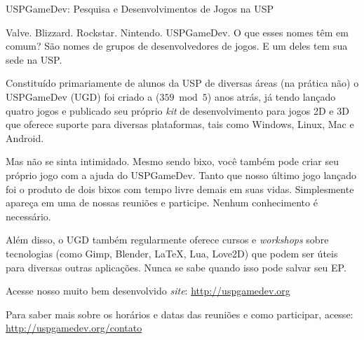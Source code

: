 \begin{subsecao}{USPGameDev: Pesquisa e Desenvolvimentos de Jogos na USP}

Valve. Blizzard. Rockstar. Nintendo. USPGameDev. O que esses nomes têm em comum?
São nomes de grupos de desenvolvedores de jogos. E um deles tem sua sede na USP.

Constituído primariamente de alunos da USP de diversas áreas (na prática não) o 
USPGameDev (UGD) foi criado a ($359 \bmod 5$) anos atrás, já tendo lançado quatro jogos e 
publicado seu próprio \textit{kit} de desenvolvimento para jogos 2D e 3D que 
oferece suporte para diversas plataformas, tais como Windows, Linux, Mac e Android. 

Mas não se sinta intimidado. Mesmo sendo bixo, você também pode criar seu
próprio jogo com a ajuda do USPGameDev. Tanto que nosso último jogo lançado
foi o produto de dois bixos com tempo livre demais em suas vidas. Simplesmente
apareça em uma de nossas reuniões e participe. Nenhum conhecimento é necessário.

Além disso, o UGD também regularmente oferece cursos e \textit{workshops} sobre tecnologias
(como Gimp, Blender, LaTeX, Lua, Love2D) que podem ser úteis para
diversas outras aplicações. Nunca se sabe quando isso pode
salvar seu EP.

Acesse nosso muito bem desenvolvido \textit{site}: 
\url{http://uspgamedev.org}

Para saber mais sobre os horários e datas das reuniões e como participar, acesse: 
\url{http://uspgamedev.org/contato}

\end{subsecao}

